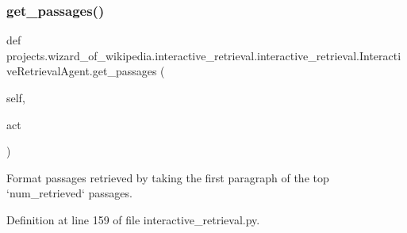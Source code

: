 \subsubsection{\texorpdfstring{get\+\_\+passages()}{get\_passages()}}
{\footnotesize\ttfamily def projects.\+wizard\+\_\+of\+\_\+wikipedia.\+interactive\+\_\+retrieval.\+interactive\+\_\+retrieval.\+Interactive\+Retrieval\+Agent.\+get\+\_\+passages (\begin{DoxyParamCaption}\item[{}]{self,  }\item[{}]{act }\end{DoxyParamCaption})}

\begin{DoxyVerb}Format passages retrieved by taking the first paragraph of the top
`num_retrieved` passages.
\end{DoxyVerb}
 

Definition at line 159 of file interactive\+\_\+retrieval.\+py.


